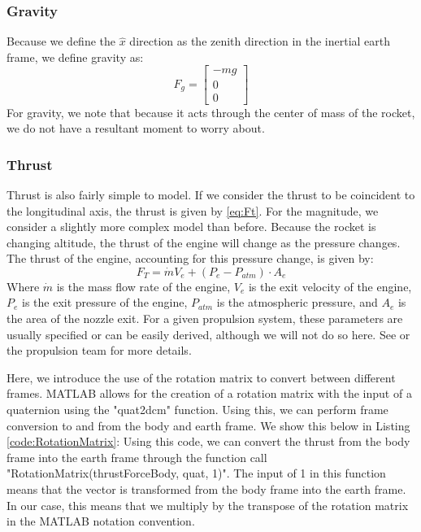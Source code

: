 \documentclass[12pt]{report}
\begin{document}
\subsubsection{Gravity}
Because we define the $\hat{x}$ direction as the zenith direction in the inertial earth frame, we define gravity as:
\begin{equation}
   F_g= \begin{bmatrix}
    -mg\\0\\0
\end{bmatrix}
\end{equation}
For gravity, we note that because it acts through the center of mass of the rocket, we do not have a resultant moment to worry about.
\subsubsection{Thrust}
Thrust is also fairly simple to model. If we consider the thrust to be coincident to the longitudinal axis, the thrust is given by \eqref{eq:Ft}. For the magnitude, we consider a slightly more complex model than before. Because the rocket is changing altitude, the thrust of the engine will change as the pressure changes. The thrust of the engine, accounting for this pressure change, is given by:
\begin{equation}
    F_T=\dot{m}V_e+\left(P_{e}-P_{atm}\right)\cdot A_e
\end{equation}
Where $\dot{m}$ is the mass flow rate of the engine, $V_e$ is the exit velocity of the engine, $P_e$ is the exit pressure of the engine, $P_{atm}$ is the atmospheric pressure, and $A_e$ is the area of the nozzle exit. For a given propulsion system, these parameters are usually specified or can be easily derived, although we will not do so here. See \cite{noauthor_chemical_nodate} or the propulsion team for more details.

Here, we introduce the use of the rotation matrix to convert between different frames. MATLAB allows for the creation of a rotation matrix with the input of a \gls{quaternion} using the "quat2dcm" function. Using this, we can perform frame conversion to and from the body and earth frame. We show this below in Listing \ref{code:RotationMatrix}:
\label{code:RotationMatrix}
Using this code, we can convert the thrust from the body frame into the earth frame through the function call "RotationMatrix(thrustForceBody, quat, 1)". The input of 1 in this function means that the vector is transformed from the body frame into the earth frame. In our case, this means that we multiply by the transpose of the rotation matrix in the MATLAB notation convention.
\end{document}

